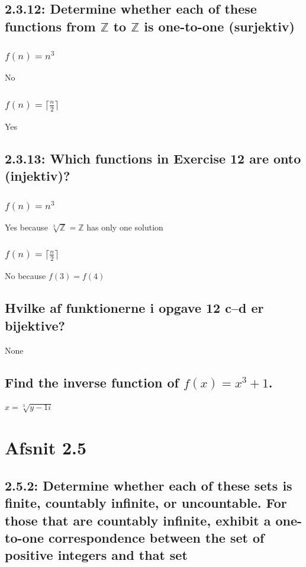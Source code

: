 \documentclass[12pt, a4paper]{report}
\begin{document}
				\subsection{2.3.12: Determine whether each of these functions from $\mathbb{Z}$ to $\mathbb{Z}$ is one-to-one (surjektiv)}
					\setcounter{subsubsection}{2}
					\subsubsection{$f(n)=n^3$}
						No
					\subsubsection{$f(n)=\lceil \frac{n}{2}\rceil$}
						Yes
					\subsection{2.3.13: Which functions in Exercise 12 are onto (injektiv)?}
					\setcounter{subsubsection}{2}
					\subsubsection{$f(n)=n^3$}
						Yes because $\sqrt[3]{\mathbb{Z}}=\mathbb{Z}$ has only one solution
					\subsubsection{$f(n)=\lceil \frac{n}{2}\rceil$}
						No because $f(3)=f(4)$
				\subsection{Hvilke af funktionerne i opgave 12 c–d er bijektive?}
					None
				\setcounter{subsection}{70}
				\subsection{Find the inverse function of $f(x)=x^3+1$.}
					$x=\sqrt[3]{y-1i}$
			\section{Afsnit 2.5}
				\setcounter{subsection}{1}
				\subsection{2.5.2: Determine whether each of these sets is ﬁnite, countably inﬁnite, or uncountable. For those that are countably inﬁnite, exhibit a one-to-one correspondence between the set of positive integers and that set}
\end{document}
